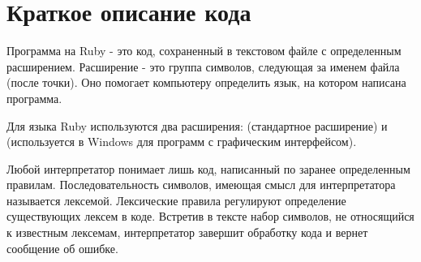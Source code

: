 \section{Краткое описание кода}

Программа на Ruby - это код, сохраненный в текстовом файле с определенным расширением. Расширение - это группа символов, следующая за именем файла (после точки). Оно помогает компьютеру определить язык, на котором написана программа.

Для языка Ruby используются два расширения:  (стандартное расширение) и  (используется в Windows для программ с графическим интерфейсом).

Любой интерпретатор понимает лишь код, написанный по заранее определенным правилам. Последовательность символов, имеющая смысл для интерпретатора называется лексемой. Лексические правила регулируют определение существующих лексем в коде. Встретив в тексте набор символов, не относящийся к известным лексемам, интерпретатор завершит обработку кода и вернет сообщение об ошибке.


